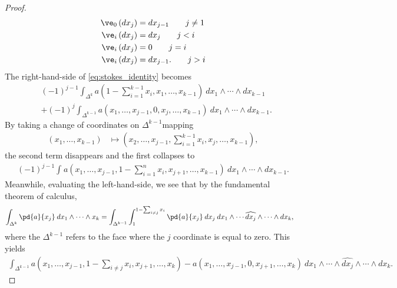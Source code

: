 \documentclass[10pt]{mypackage}
\begin{document}
\begin{proof}
\begin{align*}
    \ve_0\left( dx_j \right) &= dx_{j-1} \tag*{$j\neq 1$}\\
    \ve_i\left( dx_j \right) &= dx_j \tag*{$j < i$}\\
    \ve_i\left( dx_j \right) &= 0 \tag*{$j = i$}\\
    \ve_i\left( dx_j \right) &= dx_{j-1}. \tag*{$j > i$}
  \end{align*}
  The right-hand-side of \eqref{eq:stokes_identity} becomes
  \begin{align*}
    &\left( -1 \right)^{j-1} \int_{\Delta^{k}}^{} a\left( 1 - \sum_{i=1}^{k-1}x_i,x_1,\dots,x_{k-1} \right)\:dx_1\wedge\cdots\wedge dx_{k-1} \\
    &+ \left( -1 \right)^{j} \int_{\Delta^{k-1}}^{} a\left( x_1,\dots,x_{j-1},0,x_j,\dots,x_{k-1} \right)\:dx_1\wedge\cdots\wedge dx_{k-1}.
  \end{align*}
  By taking a change of coordinates on $\Delta^{k-1}$mapping
  \begin{align*}
    \left( x_1,\dots,x_{k-1} \right) &\mapsto \left( x_2,\dots,x_{j-1},\sum_{i=1}^{k-1}x_i,x_j,\dots,x_{k-1} \right),
  \end{align*}
  the second term disappears and the first collapses to
  \begin{align*}
    \left( -1 \right)^{j-1} \int_{}^{} a\left( x_1,\dots,x_{j-1},1-\sum_{i=1}^{n}x_i,x_{j+1},\dots,x_{k-1} \right)\:dx_1\wedge\cdots\wedge dx_{k-1}.
  \end{align*}
  Meanwhile, evaluating the left-hand-side, we see that by the fundamental theorem of calculus,
  \begin{align*}
    \int_{\Delta^{k}}^{} \pd{a}{x_j}\:dx_1\wedge\cdots\wedge x_k &= \int_{\Delta^{k-1}}^{} \int_{1}^{1-\sum_{i\neq j}x_i} \pd{a}{x_j}\:dx_j\:dx_1\wedge\cdots\widehat{dx_j}\wedge\cdots\wedge dx_{k},
  \end{align*}
  where the $\Delta^{k-1}$ refers to the face where the $j$ coordinate is equal to zero. This yields
  \begin{align*}
    \int_{\Delta^{k-1}}^{} a\left( x_1,\dots,x_{j-1},1-\sum_{i\neq j}x_i,x_{j+1},\dots,x_k \right) - a\left( x_1,\dots,x_{j-1},0,x_{j+1},\dots,x_k \right)\:dx_1\wedge\cdots\wedge \widehat{dx_j}\wedge\cdots\wedge dx_k.
  \end{align*}
\end{proof}
\end{document}
